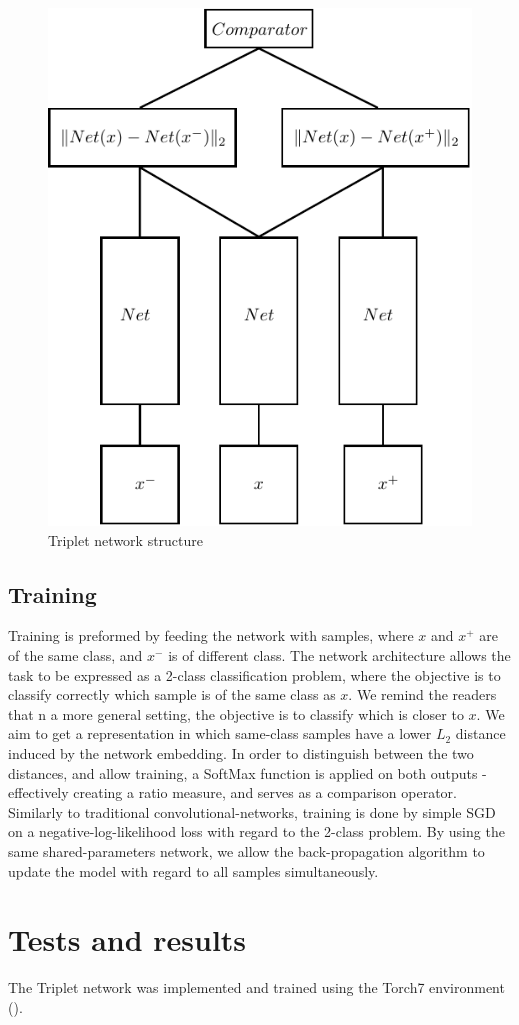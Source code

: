 \documentclass{article} %
\begin{document}
\begin{figure}[h]
\begin{center}
\includegraphics[width=0.5\linewidth]{TripletNet_scheme.pdf}
\end{center}
   \caption{Triplet network structure }\label{tripletnet_scheme}
\end{figure}

\subsection{Training}
Training is preformed by feeding the network with samples, where $x$ and $x^{+}$ are of the same class, and $x^{-}$ is of different class.
The network architecture allows the task to be expressed as a 2-class classification problem, where the objective is to classify correctly which sample is of the same class as $x$.
We remind the readers that n a more general setting, the objective is to classify which is closer to $x$.
We aim to get a representation in which same-class samples have a lower $L_2$ distance induced by the network embedding.
In order to distinguish between the two distances, and allow training,
a SoftMax function is applied on both outputs - effectively creating a ratio measure, and serves as a comparison operator.\\
Similarly to traditional convolutional-networks, training is done by simple SGD on a negative-log-likelihood loss with regard to the 2-class problem.
By using the same shared-parameters network, we allow the back-propagation algorithm to update the model with regard to all samples simultaneously.

\section{Tests and results}
 The Triplet network was implemented and trained using the Torch7 environment (\citet{collobert2011torch7}).
\end{document}
